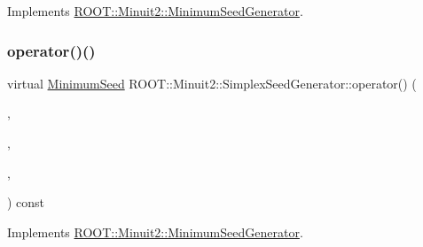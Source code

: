 Implements \mbox{\hyperlink{classROOT_1_1Minuit2_1_1MinimumSeedGenerator_ae71de52027d3f0c7fa202c7cf65b947a}{R\+O\+O\+T\+::\+Minuit2\+::\+Minimum\+Seed\+Generator}}.

\mbox{\label{classROOT_1_1Minuit2_1_1SimplexSeedGenerator_a483dc9272be849a23bcd0d29ac4e3b94}} 
\subsubsection{\texorpdfstring{operator()()}{operator()()}\hspace{0.1cm}{\footnotesize\ttfamily [3/4]}}
{\footnotesize\ttfamily virtual \mbox{\hyperlink{classROOT_1_1Minuit2_1_1MinimumSeed}{Minimum\+Seed}} R\+O\+O\+T\+::\+Minuit2\+::\+Simplex\+Seed\+Generator\+::operator() (\begin{DoxyParamCaption}\item[{const \mbox{\hyperlink{classROOT_1_1Minuit2_1_1MnFcn}{Mn\+Fcn}} \&}]{,  }\item[{const \mbox{\hyperlink{classROOT_1_1Minuit2_1_1AnalyticalGradientCalculator}{Analytical\+Gradient\+Calculator}} \&}]{,  }\item[{const \mbox{\hyperlink{classROOT_1_1Minuit2_1_1MnUserParameterState}{Mn\+User\+Parameter\+State}} \&}]{,  }\item[{const \mbox{\hyperlink{classROOT_1_1Minuit2_1_1MnStrategy}{Mn\+Strategy}} \&}]{ }\end{DoxyParamCaption}) const\hspace{0.3cm}{\ttfamily [virtual]}}



Implements \mbox{\hyperlink{classROOT_1_1Minuit2_1_1MinimumSeedGenerator_a670b9671c73d7e0d3caa148e82d4b2fa}{R\+O\+O\+T\+::\+Minuit2\+::\+Minimum\+Seed\+Generator}}.

\mbox{\label{classROOT_1_1Minuit2_1_1SimplexSeedGenerator_abce591c5a1e1aa0882dd5b474530efce}} 

